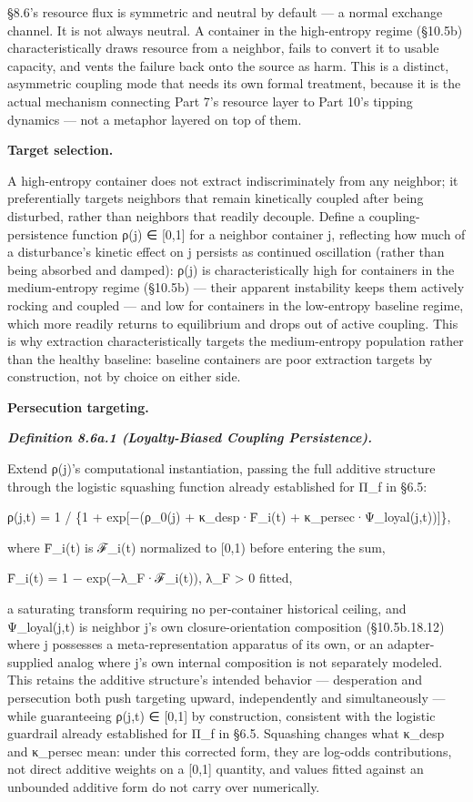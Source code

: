\documentclass[
]{article}
\begin{document}
§8.6's resource flux is symmetric and neutral by default --- a normal
exchange channel. It is not always neutral. A container in the
high-entropy regime (§10.5b) characteristically draws resource from a
neighbor, fails to convert it to usable capacity, and vents the failure
back onto the source as harm. This is a distinct, asymmetric coupling
mode that needs its own formal treatment, because it is the actual
mechanism connecting Part 7's resource layer to Part 10's tipping
dynamics --- not a metaphor layered on top of them.

\textbf{Target selection.}

A high-entropy container does not extract indiscriminately from any
neighbor; it preferentially targets neighbors that remain kinetically
coupled after being disturbed, rather than neighbors that readily
decouple. Define a coupling-persistence function ρ(j) ∈ {[}0,1{]} for a
neighbor container j, reflecting how much of a disturbance's kinetic
effect on j persists as continued oscillation (rather than being
absorbed and damped): ρ(j) is characteristically high for containers in
the medium-entropy regime (§10.5b) --- their apparent instability keeps
them actively rocking and coupled --- and low for containers in the
low-entropy baseline regime, which more readily returns to equilibrium
and drops out of active coupling. This is why extraction
characteristically targets the medium-entropy population rather than the
healthy baseline: baseline containers are poor extraction targets by
construction, not by choice on either side.

\textbf{Persecution targeting.}

\emph{\textbf{Definition 8.6a.1 (Loyalty-Biased Coupling Persistence).}}

Extend ρ(j)'s computational instantiation, passing the full additive
structure through the logistic squashing function already established
for Π\_f in §6.5:

ρ(j,t) = 1 / \{1 + exp{[}−(ρ\_0(j) + κ\_desp·F̄\_i(t) +
κ\_persec·Ψ\_loyal(j,t)){]}\},

where F̄\_i(t) is ℱ\_i(t) normalized to {[}0,1) before entering the sum,

F̄\_i(t) = 1 − exp(−λ\_F·ℱ\_i(t)), λ\_F \textgreater{} 0 fitted,

a saturating transform requiring no per-container historical ceiling,
and Ψ\_loyal(j,t) is neighbor j's own closure-orientation composition
(§10.5b.18.12) where j possesses a meta-representation apparatus of its
own, or an adapter-supplied analog where j's own internal composition is
not separately modeled. This retains the additive structure's intended
behavior --- desperation and persecution both push targeting upward,
independently and simultaneously --- while guaranteeing ρ(j,t) ∈
{[}0,1{]} by construction, consistent with the logistic guardrail
already established for Π\_f in §6.5. Squashing changes what κ\_desp and
κ\_persec mean: under this corrected form, they are log-odds
contributions, not direct additive weights on a {[}0,1{]} quantity, and
values fitted against an unbounded additive form do not carry over
numerically.
\end{document}
